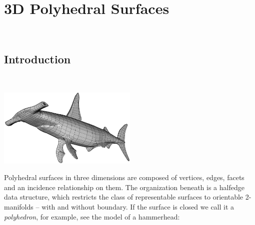 
\ccParDims

\chapter{3D Polyhedral Surfaces}
\label{chapterPolyhedron}
\\

\vspace*{-15mm}
\minitoc
\vspace*{30mm}


\section{Introduction}
\label{sectionPolyIntro}

\begin{ccTexOnly}
    \vspace*{-50mm}
    \begin{flushright}~\hspace{1cm}
      \parbox{0.5\textwidth}{%
          \includegraphics[width=0.5\textwidth]{Polyhedron/fig/shark}%
      }%
    \end{flushright}
\end{ccTexOnly}

Polyhedral surfaces in three dimensions are composed of vertices,
edges, facets and an incidence relationship on them. The organization
beneath is a halfedge data structure, which restricts the class of
representable surfaces to orientable 2-manifolds -- with and without
boundary. If the surface is closed we call it a {\em polyhedron}, for
example, see the  model of a hammerhead:

